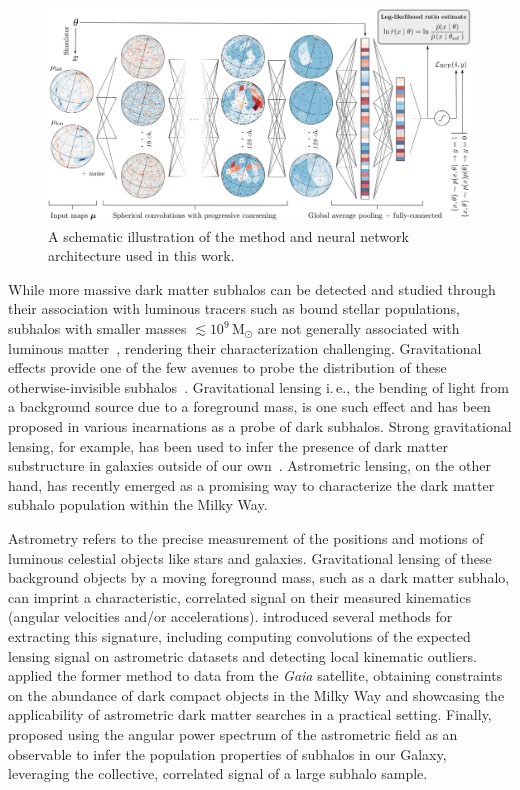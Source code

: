 \documentclass[twocolumn,linenumbers]{aastex631}
\newcommand{\ie}{{i.\,e.}\xspace}
\begin{document}
\begin{figure}[!htbp]
\centering
\includegraphics[width=1.00\textwidth]{summary.pdf}
\caption{A schematic illustration of the method and neural network architecture used in this work.}
\label{fig:model}
\end{figure}

While more massive dark matter subhalos can be detected and studied through their association with luminous tracers such as bound stellar populations, subhalos with smaller masses $\lesssim 10^9\,\mathrm M_\odot$ are not generally associated with luminous matter~\citep{Fitts:2016usl,2017MNRAS.467.2019R}, rendering their characterization challenging. Gravitational effects provide one of the few avenues to probe the distribution of these otherwise-invisible subhalos~\citep{Buckley:2017ijx}. Gravitational lensing \ie, the bending of light from a background source due to a foreground mass, is one such effect and has been proposed in various incarnations as a probe of dark subhalos. 
Strong gravitational lensing, for example, has been used to infer the presence of dark matter substructure in galaxies outside of our own~\citep{Hezaveh:2016ltk,Vegetti:2009cz,Gilman:2019nap,Vegetti:2012mc}.
Astrometric lensing, on the other hand, has recently emerged as a promising way to characterize the dark matter subhalo population within the Milky Way.

Astrometry refers to the precise measurement of the positions and motions of luminous celestial objects like stars and galaxies. Gravitational lensing of these background objects by a moving foreground mass, such as a dark matter subhalo, can imprint a characteristic, correlated signal on their measured kinematics (angular velocities and/or accelerations). \citet{VanTilburg:2018ykj} introduced several methods for extracting this signature, including computing convolutions of the expected lensing signal on astrometric datasets and detecting local kinematic outliers. \citet{Mondino:2020rkn} applied the former method to data from the \emph{Gaia} satellite, obtaining constraints on the abundance of dark compact objects in the Milky Way and showcasing the applicability of astrometric dark matter searches in a practical setting. Finally, \citet{Mishra-Sharma:2020ynk} proposed using the angular power spectrum of the astrometric field as an observable to infer the population properties of subhalos in our Galaxy, leveraging the collective, correlated signal of a large subhalo sample. 
\end{document}
